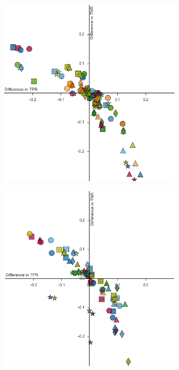 \documentclass{sig-alternate-05-2015}
\begin{document}
	\begin{figure}
		
		\centering
		\vspace*{-1.5cm}\hspace*{-1.5cm}\begin{subfigure}{.5\textwidth}
			\includegraphics[scale=0.61]{classifier_dataset_plt_2016-11-01_10-20-21}
		\end{subfigure}\hspace*{4cm}\vspace*{-0.5cm}%
		\hspace*{-2cm}\begin{subfigure}{.5\textwidth}
			\includegraphics[scale=0.61]{classifier_dataset_plt_2016-11-01_12-15-14}

\end{subfigure}
\end{figure}
\end{document}
